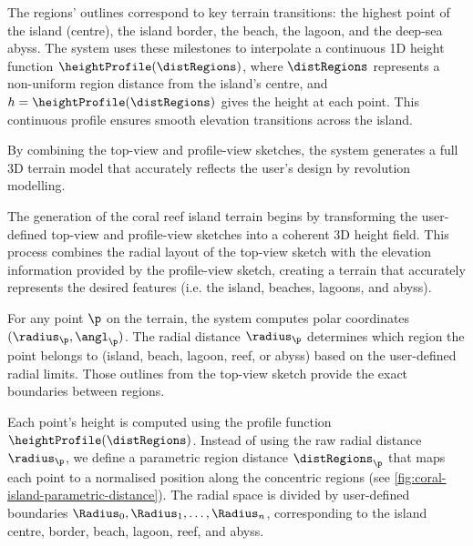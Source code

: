 The regions' outlines correspond to key terrain transitions: the highest point of the island (centre), the island border, the beach, the lagoon, and the deep-sea abyss. The system uses these milestones to interpolate a continuous 1D height function $\heightProfile(\distRegions)$, where $\distRegions$ represents a non-uniform region distance from the island's centre, and $h = \heightProfile(\distRegions)$ gives the height at each point. This continuous profile ensures smooth elevation transitions across the island.

By combining the top-view and profile-view sketches, the system generates a full 3D terrain model that accurately reflects the user's design by revolution modelling.

The generation of the coral reef island terrain begins by transforming the user-defined top-view and profile-view sketches into a coherent 3D height field. This process combines the radial layout of the top-view sketch with the elevation information provided by the profile-view sketch, creating a terrain that accurately represents the desired features (i.e. the island, beaches, lagoons, and abyss).

For any point $\p$ on the terrain, the system computes polar coordinates $(\radius_\p, \angl_\p)$. The radial distance $\radius_\p$ determines which region the point belongs to (island, beach, lagoon, reef, or abyss) based on the user-defined radial limits. Those outlines from the top-view sketch provide the exact boundaries between regions.

Each point's height is computed using the profile function $\heightProfile(\distRegions)$. Instead of using the raw radial distance $\radius_\p$, we define a parametric region distance $\distRegions_\p$ that maps each point to a normalised position along the concentric regions (see \cref{fig:coral-island-parametric-distance}). The radial space is divided by user-defined boundaries $\Radius_0, \Radius_1, \dots, \Radius_n$, corresponding to the island centre, border, beach, lagoon, reef, and abyss.


